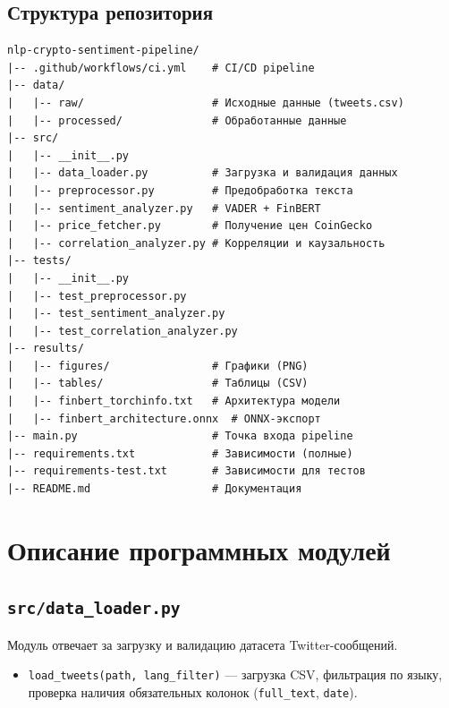 \documentclass[a4paper,12pt]{article}
\begin{document}
\subsection{Структура репозитория}

\begin{lstlisting}[language={}, caption={Структура каталогов проекта}]
nlp-crypto-sentiment-pipeline/
|-- .github/workflows/ci.yml    # CI/CD pipeline
|-- data/
|   |-- raw/                    # Исходные данные (tweets.csv)
|   |-- processed/              # Обработанные данные
|-- src/
|   |-- __init__.py
|   |-- data_loader.py          # Загрузка и валидация данных
|   |-- preprocessor.py         # Предобработка текста
|   |-- sentiment_analyzer.py   # VADER + FinBERT
|   |-- price_fetcher.py        # Получение цен CoinGecko
|   |-- correlation_analyzer.py # Корреляции и каузальность
|-- tests/
|   |-- __init__.py
|   |-- test_preprocessor.py
|   |-- test_sentiment_analyzer.py
|   |-- test_correlation_analyzer.py
|-- results/
|   |-- figures/                # Графики (PNG)
|   |-- tables/                 # Таблицы (CSV)
|   |-- finbert_torchinfo.txt   # Архитектура модели
|   |-- finbert_architecture.onnx  # ONNX-экспорт
|-- main.py                     # Точка входа pipeline
|-- requirements.txt            # Зависимости (полные)
|-- requirements-test.txt       # Зависимости для тестов
|-- README.md                   # Документация
\end{lstlisting}


\section{Описание программных модулей}

\subsection{\texttt{src/data\_loader.py}}

Модуль отвечает за загрузку и валидацию датасета Twitter-сообщений.

\begin{itemize}
  \item \texttt{load\_tweets(path, lang\_filter)} --- загрузка CSV, фильтрация по языку,
        проверка наличия обязательных колонок (\texttt{full\_text}, \texttt{date}).
\end{itemize}
\end{document}
